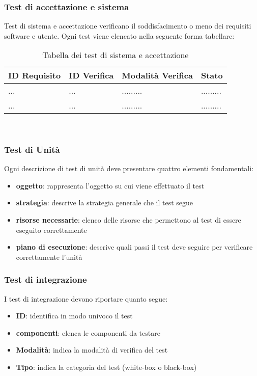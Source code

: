 \documentclass[a4paper,11pt]{article}
\begin{document}
\subsubsection{Test di accettazione e sistema }
Test di sistema e accettazione verificano il soddisfacimento o meno dei requisiti software e utente. Ogni test viene elencato nella seguente forma tabellare:\\
\begin{table}[h!]
\begin{tabularx}{\textwidth}{XXXX}
ID Requisito & ID Verifica & Modalit\`a Verifica & Stato\\
\toprule
... & ... & ......... & ......... \\
\midrule
... & ... & ......... & ......... \\
\midrule
\end{tabularx}
\caption{Tabella dei test di sistema e accettazione}
\end{table}
\vspace{3 mm}\\
\subsubsection{Test di Unit\`a}
Ogni descrizione di test di unit\`a deve presentare quattro elementi fondamentali:
\begin{itemize}
\item \textbf{oggetto}: rappresenta l'oggetto su cui viene effettuato il test
\item \textbf{strategia}: descrive la strategia generale che il test segue
\item \textbf{risorse necessarie}: elenco delle risorse che permettono al test di essere eseguito correttamente
\item \textbf{piano di esecuzione}: descrive quali passi il test deve seguire per verificare correttamente l'unit\`a
\end{itemize}
\subsubsection{Test di integrazione}
I test di integrazione devono riportare quanto segue:
\begin{itemize}
\item \textbf{ID}: identifica in modo univoco il test
\item \textbf{componenti}: elenca le componenti da testare
\item \textbf{Modalit\`a}: indica la modalit\`a di verifica del test
\item \textbf{Tipo}: indica la categoria del test (white-box o black-box)
\end{itemize}
\end{document}
